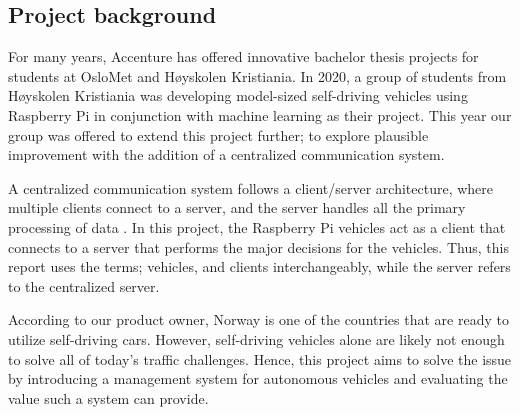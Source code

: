 \subsection{Project background}
For many years, Accenture has offered innovative bachelor thesis projects for students at OsloMet and Høyskolen Kristiania. In 2020, a group of students from Høyskolen Kristiania was developing model-sized self-driving vehicles using Raspberry Pi in conjunction with machine learning as their project. This year our group was offered to extend this project further; to explore plausible improvement with the addition of a centralized communication system.

A centralized communication system follows a client/server architecture, where multiple clients connect to a server, and the server handles all the primary processing of data \parencite{centralized}. In this project, the Raspberry Pi vehicles act as a client that connects to a server that performs the major decisions for the vehicles. Thus, this report uses the terms; vehicles, and clients interchangeably, while the server refers to the centralized server.

According to our product owner, Norway is one of the countries that are ready to utilize self-driving cars. However, self-driving vehicles alone are likely not enough to solve all of today's traffic challenges. Hence, this project aims to solve the issue by introducing a management system for autonomous vehicles and evaluating the value such a system can provide.